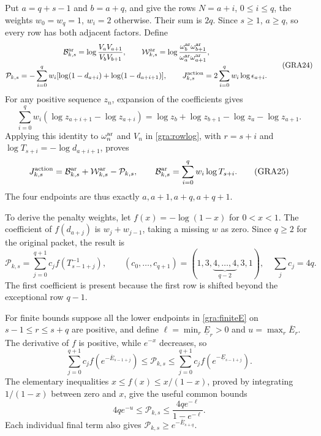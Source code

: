 \documentclass[11pt,a4paper]{article}
\begin{document}
Put $a=q+s-1$ and $b=a+q$, and give the rows $N=a+i$, $0\le i\le q$,
the weights $w_0=w_q=1$, $w_i=2$ otherwise.  Their sum is $2q$.
Since $s\ge1$, $a\ge q$, so every row has both adjacent factors.
Define
\begin{equation}
 \begin{gathered}
 \mathcal B_{k,s}^{\rm ar}=\log\frac{V_aV_{a+1}}{V_bV_{b+1}},\qquad
 \mathcal W_{k,s}^{\rm ar}=\log\frac{\omega_b^{\rm ar}\omega_{b+1}^{\rm ar}}
                                      {\omega_a^{\rm ar}\omega_{a+1}^{\rm ar}},\\
 \mathcal P_{k,s}=-\sum_{i=0}^qw_i
       [\log(1-d_{a+i})+\log(1-d_{a+i+1})],\qquad
 J_{k,s}^{\rm action}=2\sum_{i=0}^qw_i\log\epsilon_{a+i}.
 \end{gathered}\tag{GRA24}\label{gra:shifteddefs}
\end{equation}
For any positive sequence $z_n$, expansion of the coefficients gives
\[
 \sum_{i=0}^qw_i(\log z_{a+i+1}-\log z_{a+i})
 =\log z_b+\log z_{b+1}-\log z_a-\log z_{a+1}.
\]
Applying this identity to $\omega_n^{\rm ar}$ and $V_n$ in
\eqref{gra:rowlog}, with $r=s+i$ and
$\log T_{s+i}=-\log d_{a+i+1}$, proves
\begin{equation}
 J_{k,s}^{\rm action}
 =\mathcal B_{k,s}^{\rm ar}+\mathcal W_{k,s}^{\rm ar}-\mathcal P_{k,s},
 \qquad
 \mathcal B_{k,s}^{\rm ar}=\sum_{i=0}^qw_i\log T_{s+i}.
 \tag{GRA25}\label{gra:action}
\end{equation}
The four endpoints are thus exactly $a,a+1,a+q,a+q+1$.

To derive the penalty weights, let $f(x)=-\log(1-x)$ for $0<x<1$.
The coefficient of $f(d_{a+j})$ is $w_j+w_{j-1}$, taking a missing
$w$ as zero.  Since $q\ge2$ for the original packet, the result is
\begin{equation}
 \mathcal P_{k,s}=\sum_{j=0}^{q+1}c_jf(T_{s-1+j}^{-1}),\qquad
 (c_0,\ldots,c_{q+1})=(1,3,\underbrace{4,\ldots,4}_{q-2},3,1),
 \quad\sum_jc_j=4q.
 \tag{GRA26}\label{gra:penaltyweights}
\end{equation}
The first coefficient is present because the first row is shifted beyond
the exceptional row $q-1$.

For finite bounds suppose all the lower endpoints in
\eqref{gra:finiteE} on $s-1\le r\le s+q$ are positive, and define
$\ell=\min_r\underline E_r>0$ and $u=\max_r\overline E_r$.
The derivative of $f$ is positive, while $e^{-x}$ decreases, so
\begin{equation}
 \sum_{j=0}^{q+1}c_jf(e^{-\overline E_{s-1+j}})
 \le\mathcal P_{k,s}\le
 \sum_{j=0}^{q+1}c_jf(e^{-\underline E_{s-1+j}}).
 \tag{GRA27}\label{gra:penaltyfinite}
\end{equation}
The elementary inequalities $x\le f(x)\le x/(1-x)$, proved by
integrating $1/(1-x)$ between zero and $x$, give the useful common bounds
\begin{equation}
 4qe^{-u}\le\mathcal P_{k,s}
 \le\frac{4qe^{-\ell}}{1-e^{-\ell}}.
 \tag{GRA28}\label{gra:penaltycommon}
\end{equation}
Each individual final term also gives
$\mathcal P_{k,s}\ge e^{-\overline E_{s+q}}$.
\end{document}
